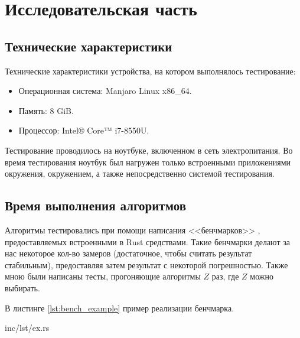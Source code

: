 \chapter{Исследовательская часть}




\section{Технические характеристики}

Технические характеристики устройства, на котором выполнялось тестирование:

\begin{itemize}
	\item Операционная система: Manjaro \cite{manjaro} Linux \cite{linux} x86\_64.
	\item Память: 8 GiB.
	\item Процессор: Intel® Core™ i7-8550U\cite{intel}.
\end{itemize}

Тестирование проводилось на ноутбуке, включенном в сеть электропитания. Во время тестирования ноутбук был нагружен только встроенными приложениями окружения, окружением, а также непосредственно системой тестирования.

\section{Время выполнения алгоритмов}

Алгоритмы тестировались при помощи написания <<бенчмарков>> \cite{rusttest}, предоставляемых встроенными в Rust средствами. Такие бенчмарки делают за нас некоторое кол-во замеров (достаточное, чтобы считать результат стабильным), предоставляя затем результат с некоторой погрешностью. Также мною были написаны тесты, прогоняющие алгоритмы $Z$ раз, где $Z$ можно выбирать.

В листинге \ref{lst:bench_example} пример реализации бенчмарка.

\begin{lstinputlisting}[
	caption={Пример бенчмарка},
	label={lst:bench_example},
	style={rust},
	]{inc/lst/ex.rs}
\end{lstinputlisting}

